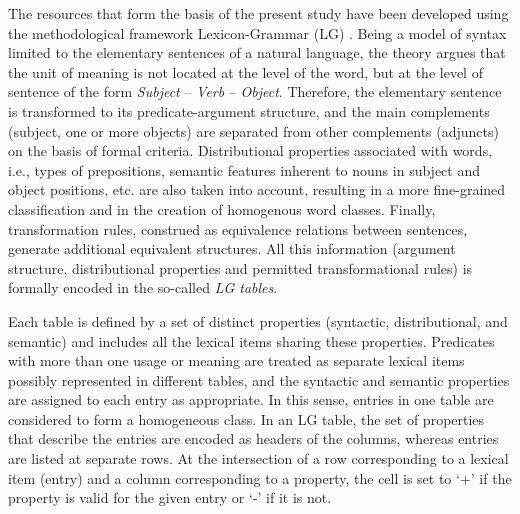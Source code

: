 \documentclass[output=paper]{langsci/langscibook}
\begin{document}
The resources that form the basis of the present study have been
developed using the methodological framework Lexicon-Grammar (LG)
\citep{gross1975methodes}. Being a model of syntax limited to the elementary
sentences of a natural language, the theory argues that the unit of
meaning is not located at the level of the word, but at the level of
sentence of the form \textit{Subject} –
\textit{Verb} – \textit{Object}. Therefore, the
elementary sentence is  transformed to its predicate-argument
structure, and the main complements (subject, one or more objects) are
separated from other complements (adjuncts) on the basis of formal
criteria. Distributional properties associated with words, i.e., types
of prepositions, semantic features inherent to nouns in subject and
object positions, etc. are also taken into account, resulting in a more
fine-grained classification and in the creation of homogenous word
classes. Finally, transformation rules, construed as equivalence
relations between sentences,  generate additional equivalent structures.
All this information (argument structure, distributional properties and
permitted transformational rules) is formally encoded in the so-called
\textit{LG tables}.



Each table is defined by a set of distinct properties (syntactic,
distributional, and semantic) and includes all the lexical items sharing
these properties. Predicates with more than one usage or meaning are
treated as separate lexical items possibly represented in different
tables, and the syntactic and semantic properties are assigned to each
entry as appropriate. In this sense, entries in one table are considered to form a homogeneous class. In an LG table, the set of properties
that describe the entries are encoded as headers of the
columns, whereas entries are listed at separate rows. At
the intersection of a row corresponding to a lexical item (entry) and a
column corresponding to a property, the cell is set to `+' if the
property is valid for the given entry or `-' if it is not. 
\end{document}
